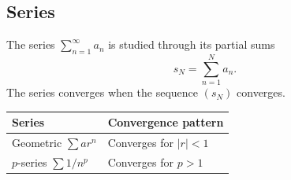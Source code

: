 \subsection*{Series}

\begin{definition*}
The series \(\sum_{n=1}^{\infty} a_n\) is studied through its partial sums
\[
  s_N=\sum_{n=1}^{N}a_n.
\]
The series converges when the sequence \((s_N)\) converges.
\end{definition*}

\begin{center}
\begin{tabular}{ll}
\toprule
Series & Convergence pattern \\
\midrule
Geometric \(\sum ar^n\) & Converges for \(|r|<1\) \\
\(p\)-series \(\sum 1/n^p\) & Converges for \(p>1\) \\
\bottomrule
\end{tabular}
\end{center}
